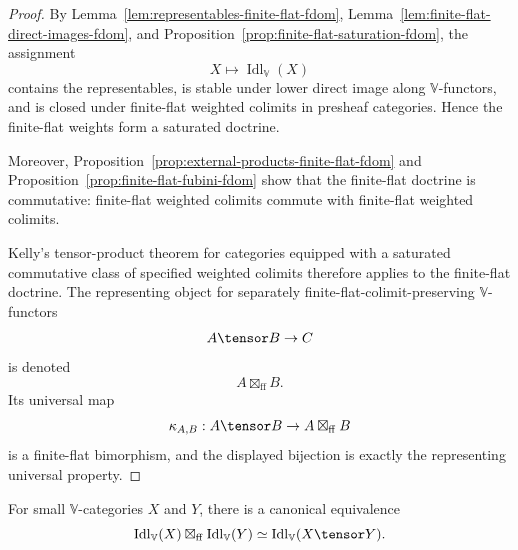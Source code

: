 \begin{proof}
By Lemma~\ref{lem:representables-finite-flat-fdom},
Lemma~\ref{lem:finite-flat-direct-images-fdom}, and
Proposition~\ref{prop:finite-flat-saturation-fdom}, the assignment
\[
    X\longmapsto \operatorname{Idl}_{\mathbb V}(X)
\]
contains the representables, is stable under lower direct image along
\(\mathbb V\)-functors, and is closed under finite-flat weighted colimits in
presheaf categories.  Hence the finite-flat weights form a saturated doctrine.

Moreover, Proposition~\ref{prop:external-products-finite-flat-fdom} and
Proposition~\ref{prop:finite-flat-fubini-fdom} show that the finite-flat
doctrine is commutative: finite-flat weighted colimits commute with finite-flat
weighted colimits.

Kelly's tensor-product theorem for categories equipped with a saturated
commutative class of specified weighted colimits therefore applies to the
finite-flat doctrine.  The representing object for separately
finite-flat-colimit-preserving \(\mathbb V\)-functors
\[
    A\tensor B\to C
\]
is denoted
\[
    A\boxtimes_{\mathrm{ff}}B.
\]
Its universal map
\[
    \kappa_{A,B}:A\tensor B\to A\boxtimes_{\mathrm{ff}}B
\]
is a finite-flat bimorphism, and the displayed bijection is exactly the
representing universal property.
\end{proof}

\begin{corollary}
\label{cor:tensor-free-fdom}
For small \(\mathbb V\)-categories \(X\) and \(Y\), there is a canonical
equivalence
\[
    \operatorname{Idl}_{\mathbb V}(X)
    \boxtimes_{\mathrm{ff}}
    \operatorname{Idl}_{\mathbb V}(Y)
    \simeq
    \operatorname{Idl}_{\mathbb V}(X\tensor Y).
\]
\end{corollary}

